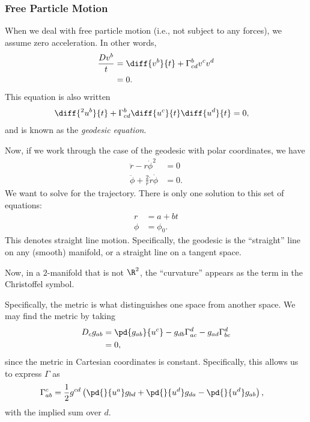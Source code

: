 \documentclass[10pt]{mypackage}
\begin{document}
  \subsubsection{Free Particle Motion}%
  When we deal with free particle motion (i.e., not subject to any forces), we assume zero acceleration. In other words,
  \begin{align*}
    \frac{Dv^{b}}{t} &= \diff{v^{b}}{t} + \Gamma^{b}_{cd}v^cv^d\\
                     &= 0.
  \end{align*}
  This equation is also written
  \begin{align*}
    \diff{^2u^b}{t} + \Gamma^{b}_{cd} \diff{u^c}{t} \diff{u^d}{t}&= 0,
  \end{align*}
  and is known as the \textit{geodesic equation}.\newline

  Now, if we work through the case of the geodesic with polar coordinates, we have
  \begin{align*}
    \ddot{r}-r\dot{\phi}^2 &= 0\\
    \ddot{\phi} + \frac{2}{r} \dot{r}\dot{\phi} &= 0.
  \end{align*}
  We want to solve for the trajectory. There is only one solution to this set of equations:
  \begin{align*}
    r &= a + bt\\
    \phi &= \phi_0.
  \end{align*}
  This denotes straight line motion. Specifically, the geodesic is the ``straight'' line on any (smooth) manifold, or a straight line on a tangent space.\newline

  Now, in a $2$-manifold that is not $\R^2$, the ``curvature'' appears as the term in the Christoffel symbol.\newline

  Specifically, the metric is what distinguishes one space from another space. We may find the metric by taking
  \begin{align*}
    D_cg_{ab} &= \pd{g_{ab}}{u^{c}} - g_{db}\Gamma_{ac}^{d} - g_{ad}\Gamma_{bc}^{d}\\
              &= 0,
  \end{align*}
  since the metric in Cartesian coordinates is constant. Specifically, this allows us to express $\Gamma$ as
  \begin{align*}
    \Gamma_{ab}^{c} &= \frac{1}{2}g^{cd}\left( \pd{}{u^a}g_{bd} + \pd{}{u^d}g_{da} - \pd{}{u^{d}}g_{ab}\right),
  \end{align*}
  with the implied sum over $d$.\newline
\end{document}
